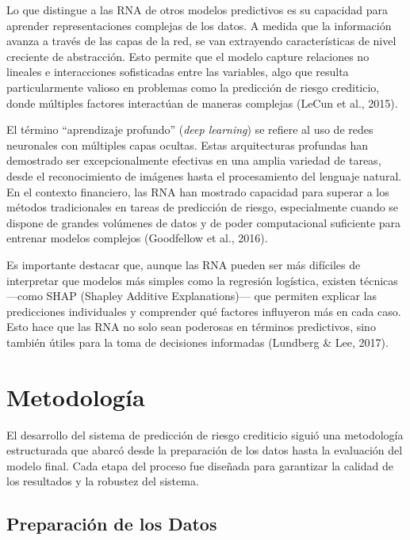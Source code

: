 \documentclass[12pt,a4paper]{article}
\begin{document}
Lo que distingue a las RNA de otros modelos predictivos es su capacidad para aprender representaciones complejas de los datos. A medida que la información avanza a través de las capas de la red, se van extrayendo características de nivel creciente de abstracción. Esto permite que el modelo capture relaciones no lineales e interacciones sofisticadas entre las variables, algo que resulta particularmente valioso en problemas como la predicción de riesgo crediticio, donde múltiples factores interactúan de maneras complejas (LeCun et al., 2015).

El término ``aprendizaje profundo'' (\textit{deep learning}) se refiere al uso de redes neuronales con múltiples capas ocultas. Estas arquitecturas profundas han demostrado ser excepcionalmente efectivas en una amplia variedad de tareas, desde el reconocimiento de imágenes hasta el procesamiento del lenguaje natural. En el contexto financiero, las RNA han mostrado capacidad para superar a los métodos tradicionales en tareas de predicción de riesgo, especialmente cuando se dispone de grandes volúmenes de datos y de poder computacional suficiente para entrenar modelos complejos (Goodfellow et al., 2016).

Es importante destacar que, aunque las RNA pueden ser más difíciles de interpretar que modelos más simples como la regresión logística, existen técnicas ---como SHAP (Shapley Additive Explanations)--- que permiten explicar las predicciones individuales y comprender qué factores influyeron más en cada caso. Esto hace que las RNA no solo sean poderosas en términos predictivos, sino también útiles para la toma de decisiones informadas (Lundberg \& Lee, 2017).

\section{Metodología}

El desarrollo del sistema de predicción de riesgo crediticio siguió una metodología estructurada que abarcó desde la preparación de los datos hasta la evaluación del modelo final. Cada etapa del proceso fue diseñada para garantizar la calidad de los resultados y la robustez del sistema.

\subsection{Preparación de los Datos}
\end{document}
